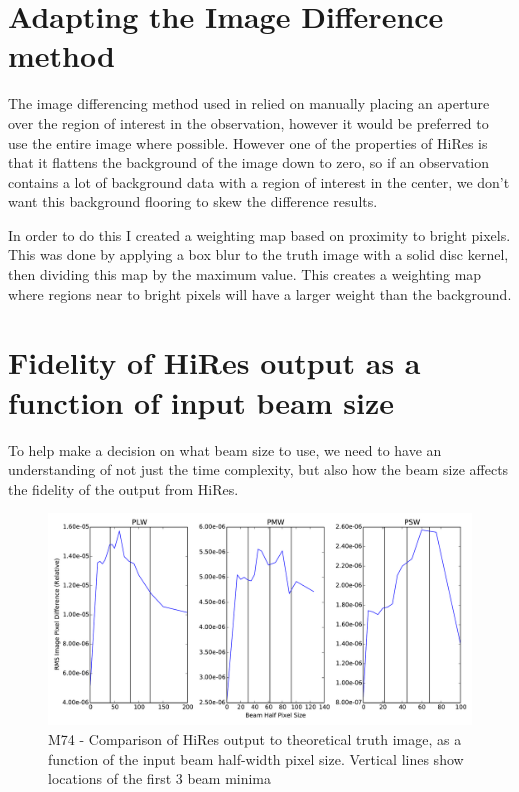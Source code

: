 \documentclass[a4paper]{article}
\numberwithin{equation}{section}
\begin{document}
\section{Adapting the Image Difference method}

The image differencing method used in \citep{badran} relied on manually placing an aperture over the region of interest in the observation, however it would be preferred to use the entire image where possible. However one of the properties of HiRes is that it flattens the background of the image down to zero, so if an observation contains a lot of background data with a region of interest in the center, we don't want this background flooring to skew the difference results.

In order to do this I created a weighting map based on proximity to bright pixels. This was done by applying a box blur to the truth image with a solid disc kernel, then dividing this map by the maximum value. This creates a weighting map where regions near to bright pixels will have a larger weight than the background.


\section{Fidelity of HiRes output as a function of input beam size}

To help make a decision on what beam size to use, we need to have an understanding of not just the time complexity, but also how the beam size affects the fidelity of the output from HiRes.

\begin{figure}[H]
    \centering
    \includegraphics[width=0.85\linewidth]{beam-size-1342189427.pdf}
    \caption{M74 - Comparison of HiRes output to theoretical truth image, as a function of the input beam half-width pixel size. Vertical lines show locations of the first 3 beam minima}
    \label{beamsize-m74}
\end{figure}
\end{document}

